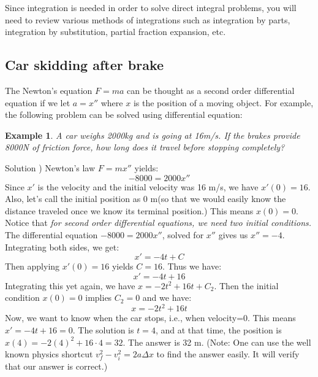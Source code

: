 \documentclass[12pt]{report}
\newtheorem{ex}{Example}[section]
\begin{document}
Since integration is needed in order to solve direct integral problems, you will need to review various methods of integrations such as integration by parts, integration by substitution, partial fraction expansion, etc.


\subsection*{Car skidding after brake}
The Newton's equation $F= ma$ can be thought as a second order differential equation if we let $a=x''$ where $x$ is the position of a moving object. For example, the following problem can be solved using differential equation:

\begin{ex} A car weighs 2000kg and is going at 16m/s. If the brakes provide 8000N of friction force, how long does it travel before stopping completely? \end{ex}

Solution ) Newton's law $F= m x''$ yields:
$$-8000= 2000 x''$$
Since $x'$ is the velocity and the initial velocity was 16 m/s, we have $x'(0)=16$. Also, let's call the initial position as 0 m(so that we would easily know the distance traveled once we know its terminal position.) This means $x(0)=0$. Notice that \textit{for second order differential equations, we need two initial conditions. }
The differential equation $-8000= 2000 x''$, solved for $x''$ gives us $x''=-4$. Integrating both sides, we get:
$$x'=-4t +C $$
Then applying $x'(0)=16$ yields $C=16$. Thus we have:
$$x'=-4t+16$$
Integrating this yet again, we have $x=-2t^2+16t+C_2$. Then the initial condition $x(0)=0$ implies $C_2 =0$ and we have:
$$x=-2t^2+16t$$
Now, we want to know when the car stops, i.e., when velocity=0. This means $x'=-4t+16=0$. The solution is $t=4$, and at that time, the position is $x(4)=-2(4)^2+16\cdot 4 = 32$. The answer is 32 m. 
(Note: One can use the well known physics shortcut $v_f^2-v_i^2=2a\Delta x $ to find the answer easily. It will verify that our answer is correct.)
\end{document}
